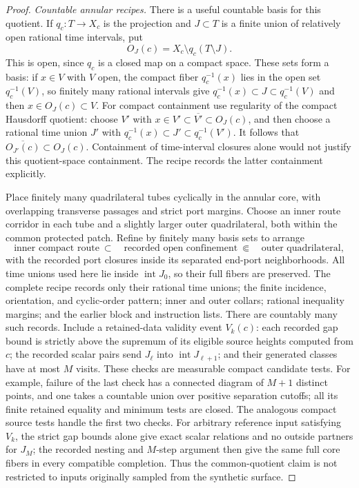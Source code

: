 \begin{proof}
\smallskip\noindent\emph{Countable annular recipes.}
There is a useful countable basis for this quotient.  If $q_c:T\to X_c$
is the projection and $J\subset T$ is a finite union of relatively open
rational time intervals, put
\[
 O_J(c)=X_c\setminus q_c(T\setminus J).
\]
This is open, since $q_c$ is a closed map on a compact space.  These sets
form a basis: if $x\in V$ with $V$ open, the compact fiber
$q_c^{-1}(x)$ lies in the open set $q_c^{-1}(V)$, so finitely many rational
intervals give $q_c^{-1}(x)\subset J\subset q_c^{-1}(V)$ and then
$x\in O_J(c)\subset V$.  For compact containment use regularity of the
compact Hausdorff quotient: choose $V'$ with
$x\in V'\subset\overline{V'}\subset O_J(c)$, and then choose a rational
time union $J'$ with $q_c^{-1}(x)\subset J'\subset q_c^{-1}(V')$.
It follows that $\overline{O_{J'}(c)}\subset O_J(c)$.  Containment of
time-interval closures alone would not justify this quotient-space
containment.  The recipe records the latter containment explicitly.

Place finitely many quadrilateral tubes cyclically in the annular core,
with overlapping transverse passages and strict port margins.  Choose
an inner route corridor in each tube and a slightly larger outer
quadrilateral, both within the common protected patch.  Refine by
finitely many basis sets to arrange
\[
 \text{inner compact route}\ \subset\quad
 \text{recorded open confinement}\ \Subset\quad
 \text{outer quadrilateral},
\]
with the recorded port closures inside its separated end-port
neighborhoods.  All time unions used here lie inside
$\operatorname{int}J_0$, so their full fibers are preserved.  The
complete recipe records only
their rational time unions; the finite incidence, orientation, and
cyclic-order pattern; inner and outer collars; rational inequality
margins; and the earlier block and instruction lists.  There are
countably many such records.  Include a retained-data validity event
$V_k(c)$: each recorded gap bound is strictly above the supremum of its
eligible source heights computed from $c$; the recorded scalar pairs
send $J_\ell$ into $\operatorname{int}J_{\ell+1}$; and their generated
classes have at most $M$ visits.  These checks are measurable compact
candidate tests.  For example, failure of the last check has a connected
diagram of $M+1$ distinct points, and one takes a countable union over
positive separation cutoffs; all its finite retained equality and
minimum tests are closed.  The analogous compact source tests handle
the first two checks.  For arbitrary reference input satisfying $V_k$,
the strict gap bounds alone give exact scalar relations and no outside
partners for $J_M$; the recorded nesting and $M$-step argument then
give the same full core fibers in every compatible completion.  Thus
the common-quotient claim is not restricted to inputs originally
sampled from the synthetic surface.


\end{proof}
